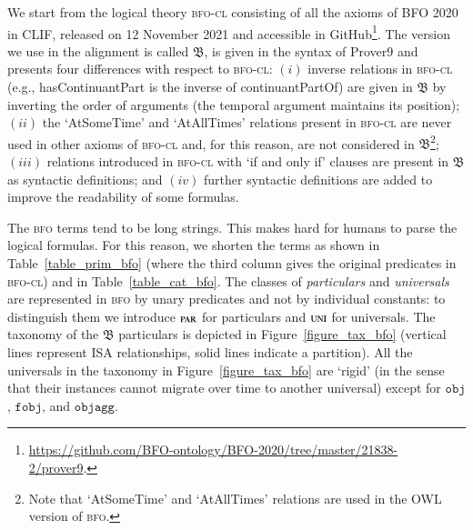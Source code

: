 \documentclass[ao]{iosart2x}
\newcommand{\nb}[1]{\textcolor{red}{$|$}\marginpar{\hspace*{-0cm}\parbox{20mm}{\scriptsize\raggedright\textcolor{red}{#1}}}}
\newcommand{\bfoDefLabel}{\textrm{d$_\texttt{b}$}}
\newcommand{\refbfodf}[1]{({\bfoDefLabel}\ref{#1})}
\newcommand{\cn}[1]{\mathtt{#1}}
\newcommand{\bfo}{{\textsc{bfo}}}
\newcommand{\bfocl}{{\textsc{bfo-cl}}}
\newcommand {\thbfo} {\ensuremath{\mathfrak{B}}}
\newcommand{\objbcat}{\cn{obj}}
\newcommand{\fobjbcat}{\cn{fobj}}
\newcommand{\objaggbcat}{\cn{objagg}}
\newcommand{\bfopartic}{\textsc{par}}
\newcommand{\bfouniv}{\textsc{uni}}
\begin{document}
We start from the logical theory {\bfocl} consisting of all the axioms of BFO 2020 in CLIF, released on 12 November 2021 and accessible in GitHub\footnote{\url{https://github.com/BFO-ontology/BFO-2020/tree/master/21838-2/prover9}.}. The version we use in the alignment is called $\thbfo$, is given in the syntax of Prover9  and presents four differences with respect to {\bfocl}: $(i)$ inverse relations in {\bfocl} (e.g., hasContinuantPart is the inverse of continuantPartOf) are given in $\thbfo$ by inverting the order of arguments (the temporal argument maintains its position);  $(ii)$ the `AtSomeTime' and `AtAllTimes' relations present in {\bfocl} are never used in other axioms of {\bfocl} and, for this reason, are not considered in $\thbfo$\footnote{Note that `AtSomeTime' and `AtAllTimes' relations are used in the OWL version of {\bfo}.}; $(iii)$ relations introduced in {\bfocl} with `if and only if' clauses are present in $\thbfo$ as syntactic definitions;
and $(iv)$ further syntactic definitions are added to improve the readability of some formulas.

The {\bfo} terms tend to be long strings. This makes hard for humans to parse the logical formulas. For this reason, we shorten the terms as shown in Table~\ref{table_prim_bfo} (where the third column gives the original predicates in {\bfocl}) and in Table~\ref{table_cat_bfo}. 
The classes of \emph{particulars} and \emph{universals} are represented in {\bfo} by unary predicates and not by individual constants: to distinguish them we introduce $\bfopartic$ for particulars and $\bfouniv$ for universals. %
The taxonomy of the $\thbfo$ particulars is depicted in Figure~\ref{figure_tax_bfo} (vertical lines represent ISA relationships, solid lines indicate a partition). All the universals in the taxonomy in Figure~\ref{figure_tax_bfo} are `rigid' (in the sense that their instances cannot migrate over time to another universal) except for $\objbcat$, $\fobjbcat$, and $\objaggbcat$. %
\end{document}
